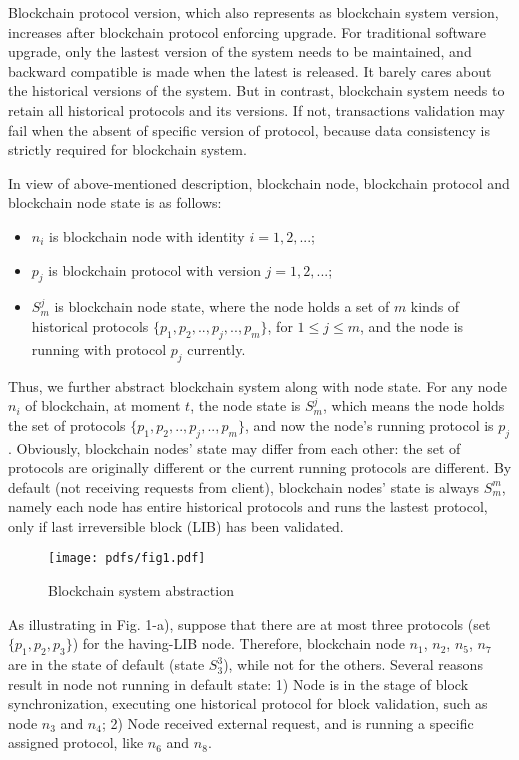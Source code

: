 \documentclass[sigplan,screen]{acmart}
\begin{document}
Blockchain protocol version, which also represents as blockchain system
version, increases after blockchain protocol enforcing upgrade. For traditional
software upgrade, only the lastest version of the system needs to be
maintained, and backward compatible is made when the latest is
released. It barely cares about the historical versions of the system. But in
contrast, blockchain system needs to retain all historical protocols and its
versions. If not, transactions validation may fail when the absent of specific
version of protocol, because data consistency is strictly required for
blockchain system.

In view of above-mentioned description, blockchain node, blockchain protocol
and blockchain node state is as follows:
\begin{itemize}
  \item $n_i$ is blockchain node with identity $i=1,2,...$;
  \item $p_j$ is blockchain protocol with version $j=1,2,...$;
  \item $S_{m}^{j}$ is blockchain node state, where the node holds a set of $m$
    kinds of historical protocols $\{p_1,p_2,..,p_j,..,p_m\}$, for
    $1{\leq}j{\leq}m$, and the node is running with protocol $p_j$ currently.
\end{itemize}

Thus, we further abstract blockchain system along with node state.
For any node $n_i$ of blockchain, at moment $t$,
the node state is $S_{m}^{j}$, which means the node holds the set of protocols
$\{p_1,p_2,..,p_j,..,p_m\}$, and now the node's running protocol is $p_j$.
Obviously, blockchain nodes' state may differ from each other: the set of
protocols are originally different or the current running protocols are
different. By default (not receiving requests from client),
blockchain nodes' state is always $S_{m}^{m}$, namely each node has entire
historical protocols and runs the lastest protocol, only if last irreversible
block (LIB) has been validated.

\begin{figure}
  \texttt{[image: pdfs/fig1.pdf]}
  \caption{Blockchain system abstraction}
\end{figure}

As illustrating in Fig. 1-a), suppose that there are at most three protocols
(set $\{p_1,p_2,p_3\}$) for the having-LIB node. Therefore,
blockchain node $n_1$, $n_2$, $n_5$, $n_7$ are in the state of default
(state $S_3^3$), while not for the others. Several reasons result in node not
running in default state: 1) Node is in the stage of block synchronization,
executing one historical protocol for block validation, such as node $n_3$ and
$n_4$; 2) Node received external request, and is running a specific assigned
protocol, like $n_6$ and $n_8$.
\end{document}
